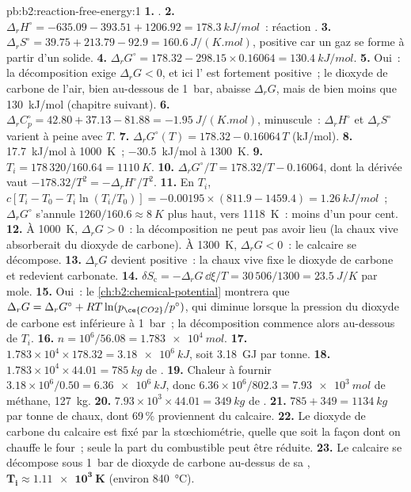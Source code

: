 \begin{solution}{pb:b2:reaction-free-energy:1}
\textbf{1.} .
\textbf{2.} $\Delta_r H^\circ = -635.09 - 393.51 + 1206.92 =
\qty{+178.3}{kJ/mol}$~: réaction .
\textbf{3.} $\Delta_r S^\circ = 39.75 + 213.79 - 92.9 = \qty{+160.6}{J/(K.mol)}$,
positive car un gaz se forme à partir d'un solide.
\textbf{4.} $\Delta_r G^\circ = 178.32 - 298.15 \times 0.16064 =
\qty{+130.4}{kJ/mol}$.
\textbf{5.} Oui~: la décomposition exige $\Delta_r G < 0$, et ici l'
est fortement positive~; le dioxyde de carbone de l'air, bien au-dessous de \qty{1}{bar},
abaisse $\Delta_r G$, mais de bien moins que \qty{130}{kJ/mol} (chapitre suivant).
\textbf{6.} $\Delta_r C^\circ_p = 42.80 + 37.13 - 81.88 =
\qty{-1.95}{J/(K.mol)}$, minuscule~: $\Delta_r H^\circ$ et $\Delta_r S^\circ$
varient à peine avec $T$.
\textbf{7.} $\Delta_r G^\circ(T) = 178.32 - 0.16064\,T$ (\unit{kJ/mol}).
\textbf{8.} \qty{+17.7}{kJ/mol} à \qty{1000}{K}~; \qty{-30.5}{kJ/mol} à
\qty{1300}{K}.
\textbf{9.} $T_i = 178\,320/160.64 = \qty{1110}{K}$.
\textbf{10.} $\Delta_r G^\circ/T = 178.32/T - 0.16064$, dont la dérivée vaut
$-178.32/T^2 = -\Delta_r H^\circ/T^2$.
\textbf{11.} En $T_i$, $c[T_i - T_0 - T_i\ln(T_i/T_0)] = -0.00195 \times
(811.9 - 1459.4) = \qty{+1.26}{kJ/mol}$~; $\Delta_r G^\circ$ s'annule
$1260/160.6 \approx \qty{8}{K}$ plus haut, vers \qty{1118}{K}~: moins
d'un pour cent.
\textbf{12.} À \qty{1000}{K}, $\Delta_r G > 0$~: la décomposition ne peut pas
avoir lieu (la chaux vive absorberait du dioxyde de carbone). À \qty{1300}{K}, $\Delta_r G <
0$~: le calcaire se décompose.
\textbf{13.} $\Delta_r G$ devient positive~: la chaux vive fixe le dioxyde de carbone
et redevient carbonate.
\textbf{14.} $\delta S_{\text{c}} = -\Delta_r G\,\dd\xi/T = 30\,506/1300 =
\qty{23.5}{J/K}$ par mole.
\textbf{15.} Oui~: le \cref{ch:b2:chemical-potential} montrera que
$\Delta_r G = \Delta_r G^\circ + RT\ln(p_{\ce{CO2}}/p^\circ)$, qui diminue
lorsque la pression du dioxyde de carbone est inférieure à \qty{1}{bar}~; la
décomposition commence alors au-dessous de $T_i$.
\textbf{16.} $n = 10^6/56.08 = \qty{1.783e4}{mol}$.
\textbf{17.} $1.783 \times 10^4 \times 178.32 = \qty{3.18e6}{kJ}$, soit
\qty{3.18}{GJ} par tonne.
\textbf{18.} $1.783 \times 10^4 \times 44.01 = \qty{785}{kg}$ de .
\textbf{19.} Chaleur à fournir $3.18 \times 10^6/0.50 = \qty{6.36e6}{kJ}$, donc
$6.36 \times 10^6/802.3 = \qty{7.93e3}{mol}$ de méthane, \qty{127}{kg}.
\textbf{20.} $7.93 \times 10^3 \times 44.01 = \qty{349}{kg}$ de .
\textbf{21.} $785 + 349 = \qty{1134}{kg}$ par tonne de chaux, dont 69\,\%
proviennent du calcaire.
\textbf{22.} Le dioxyde de carbone du calcaire est fixé par la stœchiométrie,
quelle que soit la façon dont on chauffe le four~; seule la part du combustible peut être réduite.
\textbf{23.} Le calcaire se décompose sous \qty{1}{bar} de dioxyde de carbone au-dessus
de sa , $\boldsymbol{T_i \approx \qty{1.11e3}{K}}$
(environ \qty{840}{\celsius}).
\end{solution}

